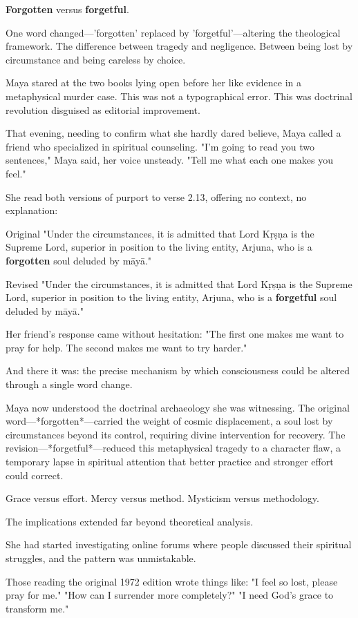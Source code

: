 \documentclass[12pt,twoside]{book}
\begin{document}
\textbf{Forgotten} versus \textbf{forgetful}.

One word changed—'forgotten' replaced by 'forgetful'—altering the theological framework. The difference between tragedy and negligence. Between being lost by circumstance and being careless by choice.

Maya stared at the two books lying open before her like evidence in a metaphysical murder case. This was not a typographical error. This was doctrinal revolution disguised as editorial improvement.

That evening, needing to confirm what she hardly dared believe, Maya called a friend who specialized in spiritual counseling. "I'm going to read you two sentences," Maya said, her voice unsteady. "Tell me what each one makes you feel."

She read both versions of purport to verse 2.13, offering no context, no explanation:

Original
"Under the circumstances, it is admitted that Lord Kṛṣṇa is the Supreme Lord, superior in position to the living entity, Arjuna, who is a \textbf{forgotten} soul deluded by māyā."

Revised
"Under the circumstances, it is admitted that Lord Kṛṣṇa is the Supreme Lord, superior in position to the living entity, Arjuna, who is a \textbf{forgetful} soul deluded by māyā."

Her friend's response came without hesitation: "The first one makes me want to pray for help. The second makes me want to try harder."

And there it was: the precise mechanism by which consciousness could be altered through a single word change.

Maya now understood the doctrinal archaeology she was witnessing. The original word—*forgotten*—carried the weight of cosmic displacement, a soul lost by circumstances beyond its control, requiring divine intervention for recovery. The revision—*forgetful*—reduced this metaphysical tragedy to a character flaw, a temporary lapse in spiritual attention that better practice and stronger effort could correct.

Grace versus effort. Mercy versus method. Mysticism versus methodology.

The implications extended far beyond theoretical analysis.

She had started investigating online forums where people discussed their spiritual struggles, and the pattern was unmistakable.

Those reading the original 1972 edition wrote things like: "I feel so lost, please pray for me." "How can I surrender more completely?" "I need God's grace to transform me."
\end{document}
